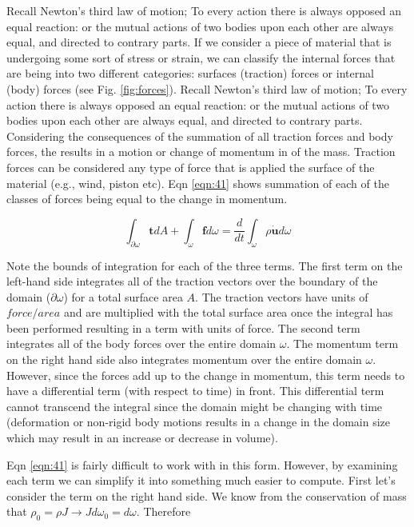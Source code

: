 \documentclass[a4paper]{article}
\begin{document}
Recall Newton's third law of motion; To every action there is always opposed an equal reaction: or the mutual actions of two bodies upon each other are always equal, and directed to contrary parts. If we consider a piece of material that is undergoing some sort of stress or strain, we can classify the internal forces that are being into two different categories: surfaces (traction) forces or internal (body) forces (see Fig. \ref{fig:forces}). Recall Newton's third law of motion; To every action there is always opposed an equal reaction: or the mutual actions of two bodies upon each other are always equal, and directed to contrary parts. Considering the consequences of the summation of all traction forces and body forces, the results in a motion or change of momentum in of the mass. Traction forces can be considered any type of force that is applied the surface of the material (e.g., wind, piston etc). Eqn \ref{eqn:41} shows summation of each of the classes of forces being equal to the change in momentum. 

\begin{equation}\label{eqn:41}
    \int_{\partial \omega} \mathbf{t} dA + \int_{\omega} \mathbf{f} d\omega = \frac{d}{dt} \int_{\omega} \rho \dot{\mathbf{u}} d\omega 
\end{equation}

Note the bounds of integration for each of the three terms. The first term on the left-hand side integrates all of the traction vectors over the boundary of the domain ($\partial \omega$) for a total surface area $A$. The traction vectors have units of $force/area$ and are multiplied with the total surface area once the integral has been performed resulting in a term with units of force. The second term integrates all of the body forces over the entire domain $\omega$. The momentum term on the right hand side also integrates momentum over the entire domain $\omega$. However, since the forces add up to the change in momentum, this term needs to have a differential term (with respect to time) in front. This differential term cannot transcend the integral since the domain might be changing with time (deformation or non-rigid body motions results in a change in the domain size which may result in an increase or decrease in volume). 

Eqn \ref{eqn:41} is fairly difficult to work with in this form. However, by examining each term we can simplify it into something much easier to compute. First let's consider the  term on the right hand side. We know from the conservation of mass that $\rho_0 = \rho J \rightarrow J d\omega_0 = d\omega$. Therefore
\end{document}
